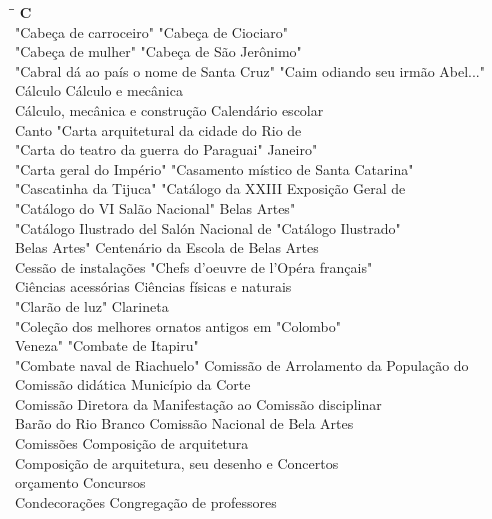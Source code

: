\begin{tabbing}
	\hspace{8,7cm}\=\hspace{1cm}\=\kill
	\textbf{C} \>  \\ 
	"Cabeça de carroceiro"	\> "Cabeça de Ciociaro"\\
	"Cabeça de mulher" \> "Cabeça de São Jerônimo"\\
	"Cabral dá ao país o nome de Santa Cruz" \> "Caim odiando seu irmão Abel..."\\
	Cálculo \> Cálculo e mecânica\\ 
	Cálculo, mecânica e construção \>  Calendário escolar\\ 
	Canto \> "Carta arquitetural da cidade do Rio de\\ 
	"Carta do teatro da guerra do Paraguai" \> Janeiro"\\
	"Carta geral do Império" \> "Casamento místico de Santa Catarina" \\	
	"Cascatinha da Tijuca"	\> "Catálogo da XXIII Exposição Geral de\\
	"Catálogo do VI Salão Nacional" \> Belas Artes"\\
	"Catálogo Ilustrado del Salón Nacional de \> "Catálogo Ilustrado"\\
	Belas Artes" \> Centenário da Escola de Belas Artes\\ 
	Cessão de instalações \>  "Chefs d'oeuvre de l'Opéra français"\\ 
	Ciências acessórias \> Ciências físicas e naturais\\ 
	"Clarão de luz" \> Clarineta\\
	"Coleção dos melhores ornatos antigos em \> "Colombo"\\		   	   
	Veneza"	\> "Combate de Itapiru"\\
	"Combate naval de Riachuelo" \> Comissão de Arrolamento da População do\\
	Comissão didática \> Município da Corte\\
	Comissão Diretora da Manifestação ao \> Comissão disciplinar\\ 
	Barão do Rio Branco \> Comissão Nacional de Bela Artes\\ 
	Comissões \> Composição de arquitetura\\ 
	Composição de arquitetura, seu desenho e \> Concertos\\
	orçamento \> Concursos \\		   	   
	Condecorações	\> Congregação de professores\\

\end{tabbing}
